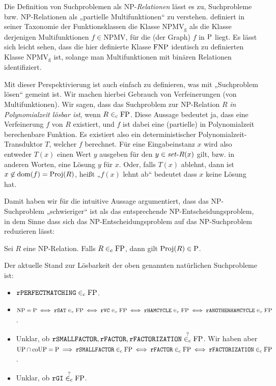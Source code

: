 Die Definition von Suchproblemen als NP-\emph{Relationen} lässt es zu, Suchprobleme bzw. NP-Relationen als „partielle Multifunktionen“ zu verstehen.
\textcite{selman_taxonomy_1994} definiert in seiner Taxonomie der Funktionsklassen die Klasse $\mathrm{NPMV_g}$ als die Klasse derjenigen Multifunktionen $f\in\mathrm{NPMV}$, für die (der Graph) $f$ in $\P$ liegt.
Es lässt sich leicht sehen, dass die hier definierte Klasse $\FNP$ identisch zu \citeauthor{selman_taxonomy_1994} definierten Klasse $\mathrm{NPMV_g}$ ist, solange man Multifunktionen mit binären Relationen identifiziert.

Mit dieser Perspektivierung ist auch einfach zu definieren, was mit „Suchproblem lösen“ gemeint ist. Wir machen hierbei Gebrauch von Verfeinerungen (von Multifunktionen).
Wir sagen, dass das Suchproblem zur NP-Relation $R$ \emph{in Polynomialzeit lösbar ist}, wenn $R\inc \mathrm{FP}$.
Diese Aussage bedeutet ja, dass eine Verfeinerung $f$ von $R$ existiert, und $f$ ist dabei eine (partielle) in Polynomialzeit berechenbare Funktion. Es existiert also ein deterministischer Polynomialzeit-Transduktor $T$, welcher $f$ berechnet.
Für eine Eingabeinstanz $x$ wird also entweder $T(x)$ einen Wert $y$ ausgeben für den $y\in\fset{}R(x)$ gilt, bzw. in anderen Worten, eine Lösung $y$ für $x$.
Oder, falls $T(x)$ ablehnt, dann ist $x\not\in\dom(f)=\Proj(R)$, heißt „$f(x)$ lehnt ab“ bedeutet dass $x$ keine Lösung hat.

Damit haben wir für die intuitive Aussage argumentiert, dass das NP-Suchproblem „schwieriger“ ist als das entsprechende NP-Entscheidungsproblem, in dem Sinne dass sich das NP-Entscheidungsproblem auf das NP-Suchproblem reduzieren lässt:
\begin{observation}\label{obs:search-stronger-than-decision}
    Sei $R$ eine NP-Relation. Falls $R\inc\FP$, dann gilt $\Proj(R)\in\P$.
\end{observation}

Der aktuelle Stand zur Lösbarkeit der oben genannten natürlichen Suchprobleme ist:\label{label:lösbarkeit}
\begin{itemize}\raggedright
    \item $\mathtt{rPERFECTMATCHING}\inc\FP$.
    \item $\NP=\P \iff \mathtt{rSAT}\inc\FP \iff \mathtt{rVC}\inc\FP \iff \mathtt{rHAMCYCLE}\inc\FP \iff \mathtt{rANOTHERHAMCYCLE}\inc\FP$.
    \item Unklar, ob $\mathtt{rSMALLFACTOR}, \mathtt{rFACTOR}, \mathtt{rFACTORIZATION}\stackrel{?}{\inc}\FP$. Wir haben aber $\UP\cap\coUP=\P \implies \mathtt{rSMALLFACTOR}\inc \FP \iff \mathtt{rFACTOR}\inc\FP \iff \mathtt{rFACTORIZATION}\inc\FP$.
    \item Unklar, ob $\mathtt{rGI}\stackrel{?}{\inc}{\FP}$.
\end{itemize}

